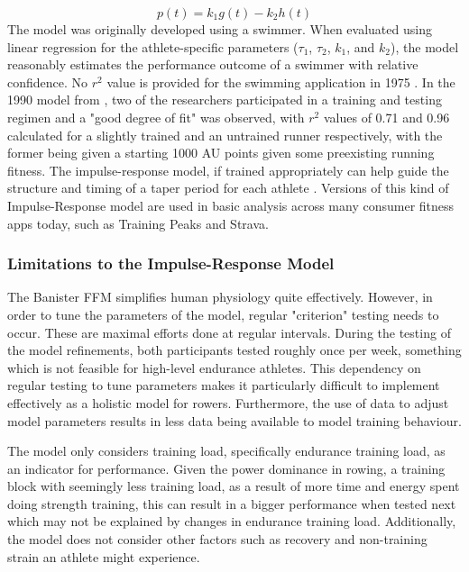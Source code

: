 \begin{equation}\label{eq:ban_perf}
  p(t) = k_1g(t)-k_2h(t)
\end{equation}
The model was originally developed using a swimmer. When evaluated using linear regression for the athlete-specific parameters ($\tau_1$, $\tau_2$, $k_1$, and $k_2$), the model reasonably estimates the performance outcome of a swimmer with relative confidence. No $r^2$ value is provided for the swimming application in 1975 \cite{Bannister1976}. In the 1990 model from \textcite{Morton1990}, two of the researchers participated in a training and testing regimen and a "good degree of fit" was observed, with $r^2$ values of 0.71 and 0.96 calculated for a slightly trained and an untrained runner respectively, with the former being given a starting 1000 AU points given some preexisting running fitness. The impulse-response model, if trained appropriately can help guide the structure and timing of a taper period for each athlete \cite{Morton1990}.
Versions of this kind of Impulse-Response model are used in basic analysis across many consumer fitness apps today, such as Training Peaks and Strava.

\subsubsection{Limitations to the Impulse-Response Model}
The Banister FFM simplifies human physiology quite effectively. However, in order to tune the parameters of the model, regular "criterion" testing needs to occur. These are maximal efforts done at regular intervals. During the testing of the \textcite{Morton1990} model refinements, both participants tested roughly once per week, something which is not feasible for high-level endurance athletes. This dependency on regular testing to tune parameters makes it particularly difficult to implement effectively as a holistic model for rowers. Furthermore, the use of data to adjust model parameters results in less data being available to model training behaviour.

The model only considers training load, specifically endurance training load, as an indicator for performance. Given the power dominance in rowing, a training block with seemingly less training load, as a result of more time and energy spent doing strength training, this can result in a bigger performance when tested next which may not be explained by changes in endurance training load. Additionally, the model does not consider other factors such as recovery and non-training strain an athlete might experience.

